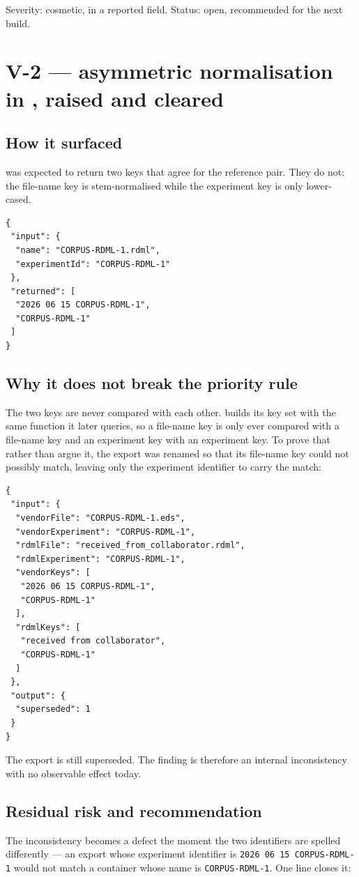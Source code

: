 Severity: cosmetic, in a reported field. Status: open, recommended for the next build.
\section{V-2 --- asymmetric normalisation in , raised and cleared}\label{sec:V2}

\subsection*{How it surfaced}
 was expected to return two keys that agree for the reference pair. They do not: the
file-name key is stem-normalised while the experiment key is only lower-cased.

\begin{lstlisting}[style=jstiny]
{
 "input": {
  "name": "CORPUS-RDML-1.rdml",
  "experimentId": "CORPUS-RDML-1"
 },
 "returned": [
  "2026 06 15 CORPUS-RDML-1",
  "CORPUS-RDML-1"
 ]
}
\end{lstlisting}


\subsection*{Why it does not break the priority rule}
The two keys are never compared with each other.  builds its key set with
the same function it later queries, so a file-name key is only ever compared with a file-name key
and an experiment key with an experiment key. To prove that rather than argue it, the export was
renamed so that its file-name key could not possibly match, leaving only the experiment identifier
to carry the match:

\begin{lstlisting}[style=jstiny]
{
 "input": {
  "vendorFile": "CORPUS-RDML-1.eds",
  "vendorExperiment": "CORPUS-RDML-1",
  "rdmlFile": "received_from_collaborator.rdml",
  "rdmlExperiment": "CORPUS-RDML-1",
  "vendorKeys": [
   "2026 06 15 CORPUS-RDML-1",
   "CORPUS-RDML-1"
  ],
  "rdmlKeys": [
   "received from collaborator",
   "CORPUS-RDML-1"
  ]
 },
 "output": {
  "superseded": 1
 }
}
\end{lstlisting}


The export is still superseded. The finding is therefore an internal inconsistency with no
observable effect today.

\subsection*{Residual risk and recommendation}
The inconsistency becomes a defect the moment the two identifiers are spelled differently --- an
export whose experiment identifier is \texttt{2026 06 15 CORPUS-RDML-1} would not match a container
whose name is \texttt{CORPUS-RDML-1}. One line closes it:

